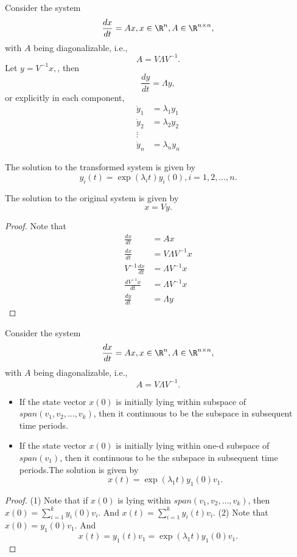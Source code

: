 \begin{refsection}
\begin{theorem}	Consider the system
	$$\frac{dx}{dt} = Ax, x\in \R^n, A\in \R^{n\times n},$$
	with $A$ being diagonalizable, i.e.,
	$$A = V\Lambda V^{-1}.$$
Let $y = V^{-1}x,$, then
$$\frac{dy}{dt} = \Lambda y,$$
or explicitly in each component,
\begin{align*}
\dot{y}_1 &= \lambda_1 y_1\\
\dot{y}_2 &= \lambda_2 y_2\\
\vdots&\\
\dot{y}_n &= \lambda_n y_n
\end{align*}

The solution to the transformed system is given by
$$y_i(t) = \exp(\lambda_it)y_i(0),i=1,2,...,n.$$

The solution to the original system is given by	
$$x=Vy.$$	
\end{theorem}
\begin{proof}
Note that
\begin{align*}
\frac{dx}{dt} &= Ax \\
\frac{dx}{dt} &= V\Lambda V^{-1}x \\
V^{-1}\frac{dx}{dt} &= \Lambda V^{-1}x \\
\frac{dV^{-1}x}{dt} &= \Lambda V^{-1}x \\
\frac{dy}{dt} &= \Lambda y 
\end{align*}
\end{proof}

\begin{theorem}
	\cite[136]{luenberger1979introduction}
Consider the system
$$\frac{dx}{dt} = Ax, x\in \R^n, A\in \R^{n\times n},$$
with $A$ being diagonalizable, i.e.,
$$A = V\Lambda V^{-1}.$$
\begin{itemize}
	\item If the state vector $x(0)$ is initially lying within subspace of $span(v_1,v_2,...,v_k)$, then it continuous to be the subspace in subsequent time periods.
	\item If the state vector $x(0)$ is initially lying within one-d subspace of $span(v_1)$, then it continuous to be the subspace in subsequent time periods.The solution is given by
	$$x(t) = \exp(\lambda_1 t)y_1(0)v_1.$$
\end{itemize}
\end{theorem}
\begin{proof}
(1) Note that if $x(0)$ is lying within	$span(v_1,v_2,...,v_k)$, then $x(0) = \sum_{i=1}^{k} y_i(0)v_i$. And $x(t) = \sum_{i=1}^{k} y_i(t)v_i$.
(2) Note that
$x(0) =  y_1(0)v_1$. And $$x(t) = y_1(t)v_1 = \exp(\lambda_1 t)y_1(0)v_1.$$
\end{proof}


\end{refsection}
